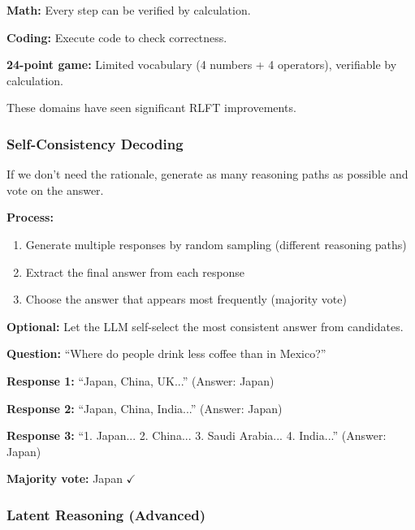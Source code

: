 \begin{exbox}
\textbf{Math:} Every step can be verified by calculation.

\textbf{Coding:} Execute code to check correctness.

\textbf{24-point game:} Limited vocabulary (4 numbers + 4 operators), verifiable by calculation.

These domains have seen significant RLFT improvements.
\end{exbox}

\bigseparator

\subsubsection{Self-Consistency Decoding}

\begin{defbox}
If we don't need the rationale, generate as many reasoning paths as possible and vote on the answer.

\textbf{Process:}
\begin{enumerate}
  \item Generate multiple responses by random sampling (different reasoning paths)
  \item Extract the final answer from each response
  \item Choose the answer that appears most frequently (majority vote)
\end{enumerate}

\textbf{Optional:} Let the LLM self-select the most consistent answer from candidates.
\end{defbox}

\begin{exbox}
\textbf{Question:} ``Where do people drink less coffee than in Mexico?''

\textbf{Response 1:} ``Japan, China, UK...'' (Answer: Japan)

\textbf{Response 2:} ``Japan, China, India...'' (Answer: Japan)

\textbf{Response 3:} ``1. Japan... 2. China... 3. Saudi Arabia... 4. India...'' (Answer: Japan)

\textbf{Majority vote:} Japan $\checkmark$
\end{exbox}

\bigseparator

\subsubsection{Latent Reasoning (Advanced)}

